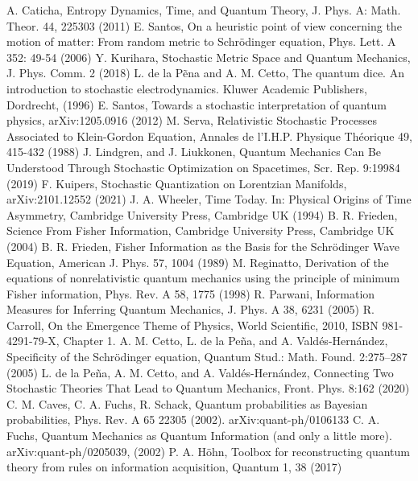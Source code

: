 \documentclass[%
 aip, 
 amsmath,amssymb,amsthm,
 nofootinbib,
 reprint,
]{revtex4-1}
\begin{document}
\begin{thebibliography}{}
A. Caticha, Entropy Dynamics, Time, and Quantum Theory, J. Phys. A: Math. Theor. 44, 225303 (2011)
E. Santos, On a heuristic point of view concerning the motion of matter: From random metric to Schr\"{o}dinger equation, Phys. Lett. A 352: 49-54 (2006)
Y. Kurihara, Stochastic Metric Space and Quantum Mechanics, J. Phys. Comm. 2 (2018)
L. de la P\~{e}na and A. M. Cetto, The quantum dice. An introduction to stochastic electrodynamics. Kluwer Academic Publishers, Dordrecht, (1996)
E. Santos, Towards a stochastic interpretation of quantum physics, arXiv:1205.0916 (2012)
M. Serva, Relativistic Stochastic Processes Associated to Klein-Gordon Equation, Annales de l'I.H.P. Physique Th\'eorique 49, 415-432 (1988)
J. Lindgren, and J. Liukkonen, Quantum Mechanics Can Be Understood Through Stochastic Optimization on Spacetimes, Scr. Rep. 9:19984 (2019)
 F. Kuipers, Stochastic Quantization on Lorentzian Manifolds, arXiv:2101.12552 (2021)
 J. A. Wheeler, Time Today. In: Physical Origins of Time Asymmetry, Cambridge University Press, Cambridge UK (1994)
B. R. Frieden, Science From Fisher Information, Cambridge University Press, Cambridge UK (2004)
B. R. Frieden, Fisher Information as the Basis for the Schr\"{o}dinger Wave Equation, American J. Phys. 57, 1004 (1989)
M. Reginatto, Derivation of the equations of nonrelativistic quantum mechanics using the principle of minimum Fisher information, Phys. Rev. A 58, 1775 (1998)
R. Parwani, Information Measures for Inferring Quantum Mechanics, J. Phys. A 38, 6231 (2005)
R. Carroll, On the Emergence Theme of Physics, World Scientific, 2010, ISBN 981-4291-79-X, Chapter 1.
A. M. Cetto, L. de la Pe\~{n}a, and A. Vald\'{e}s-Hern\'{a}ndez, Specificity of the Schr\"{o}dinger equation, Quantum Stud.: Math. Found. 2:275–287 (2005)
L. de la Pe\~{n}a, A. M. Cetto, and A. Vald\'{e}s-Hern\'{a}ndez, Connecting Two Stochastic Theories That Lead to Quantum Mechanics, Front. Phys. 8:162 (2020)
 C. M. Caves, C. A. Fuchs, R. Schack, Quantum probabilities as Bayesian probabilities, Phys. Rev. A 65 22305 (2002). arXiv:quant-ph/0106133
C. A. Fuchs, Quantum Mechanics as Quantum Information (and only a little more). arXiv:quant-ph/0205039, (2002)
 P. A. H\"{o}hn, Toolbox for reconstructing quantum theory from rules on information acquisition, Quantum 1, 38 (2017)

\end{thebibliography}
\end{document}
